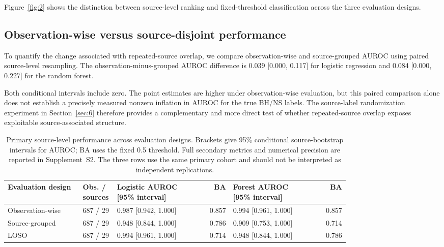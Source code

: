 \documentclass[final,5p,authoryear,nopreprintline]{elsarticle}
\begin{document}
Figure~\ref{fig:2} shows the distinction between source-level ranking and fixed-threshold classification across the three evaluation designs.

\subsection{Observation-wise versus source-disjoint performance}

To quantify the change associated with repeated-source overlap, we compare observation-wise and source-grouped AUROC using paired source-level resampling. The observation-minus-grouped AUROC difference is 0.039 [0.000, 0.117] for logistic regression and 0.084 [0.000, 0.227] for the random forest.

Both conditional intervals include zero. The point estimates are higher under observation-wise evaluation, but this paired comparison alone does not establish a precisely measured nonzero inflation in AUROC for the true BH/NS labels. The source-label randomization experiment in Section~\ref{sec:6} therefore provides a complementary and more direct test of whether repeated-source overlap exposes exploitable source-associated structure.

\begin{table}[!tp]
\centering
\caption{Primary source-level performance across evaluation designs. Brackets give 95\% conditional source-bootstrap intervals for AUROC; BA uses the fixed 0.5 threshold. Full secondary metrics and numerical precision are reported in Supplement~S2. The three rows use the same primary cohort and should not be interpreted as independent replications.}
\label{tab:performance}
\small
\setlength{\tabcolsep}{3pt}
\begin{tabular}{p{0.22\linewidth}p{0.10\linewidth}p{0.23\linewidth}rp{0.23\linewidth}r}
\toprule
Evaluation design &
Obs. / sources &
Logistic AUROC [95\% interval] &
BA &
Forest AUROC [95\% interval] &
BA \\
\midrule

Observation-wise &
687 / 29 &
0.987 [0.942, 1.000] &
0.857 &
0.994 [0.961, 1.000] &
0.857 \\

Source-grouped &
687 / 29 &
0.948 [0.844, 1.000] &
0.786 &
0.909 [0.753, 1.000] &
0.714 \\

LOSO &
687 / 29 &
0.994 [0.961, 1.000] &
0.714 &
0.948 [0.844, 1.000] &
0.786 \\

\bottomrule
\end{tabular}
\end{table}
\end{document}
